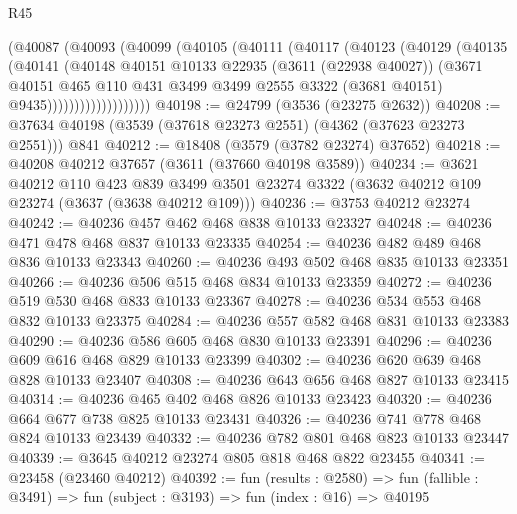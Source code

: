 \begin{lexlean}{R45}
\begin{coremodule}
                  (@40087
                    (@40093
                      (@40099
                        (@40105
                          (@40111
                            (@40117
                              (@40123
                                (@40129
                                  (@40135
                                    (@40141
                                      (@40148
                                        @40151
                                        @10133
                                        @22935
                                        (@3611 (@22938 @40027))
                                        (@3671
                                          @40151
                                          @465
                                          @110
                                          @431
                                          @3499
                                          @3499
                                          @2555
                                          @3322
                                          (@3681 @40151)
                                          @9435)))))))))))))))))))
@40198 := @24799 (@3536 (@23275 @2632))
@40208 := @37634 @40198 (@3539 (@37618 @23273 @2551) (@4362 (@37623 @23273 @2551))) @841
@40212 := @18408 (@3579 (@3782 @23274) @37652)
@40218 := @40208 @40212 @37657 (@3611 (@37660 @40198 @3589))
@40234 := @3621
    @40212
    @110
    @423
    @839
    @3499
    @3501
    @23274
    @3322
    (@3632 @40212 @109 @23274 (@3637 (@3638 @40212 @109)))
@40236 := @3753 @40212 @23274
@40242 := @40236 @457 @462 @468 @838 @10133 @23327
@40248 := @40236 @471 @478 @468 @837 @10133 @23335
@40254 := @40236 @482 @489 @468 @836 @10133 @23343
@40260 := @40236 @493 @502 @468 @835 @10133 @23351
@40266 := @40236 @506 @515 @468 @834 @10133 @23359
@40272 := @40236 @519 @530 @468 @833 @10133 @23367
@40278 := @40236 @534 @553 @468 @832 @10133 @23375
@40284 := @40236 @557 @582 @468 @831 @10133 @23383
@40290 := @40236 @586 @605 @468 @830 @10133 @23391
@40296 := @40236 @609 @616 @468 @829 @10133 @23399
@40302 := @40236 @620 @639 @468 @828 @10133 @23407
@40308 := @40236 @643 @656 @468 @827 @10133 @23415
@40314 := @40236 @465 @402 @468 @826 @10133 @23423
@40320 := @40236 @664 @677 @738 @825 @10133 @23431
@40326 := @40236 @741 @778 @468 @824 @10133 @23439
@40332 := @40236 @782 @801 @468 @823 @10133 @23447
@40339 := @3645 @40212 @23274 @805 @818 @468 @822 @23455
@40341 := @23458 (@23460 @40212)
@40392 := fun (results : @2580) =>
  fun (fallible : @3491) =>
  fun (subject : @3193) =>
  fun (index : @16) =>
  @40195

\end{coremodule}
\end{lexlean}
